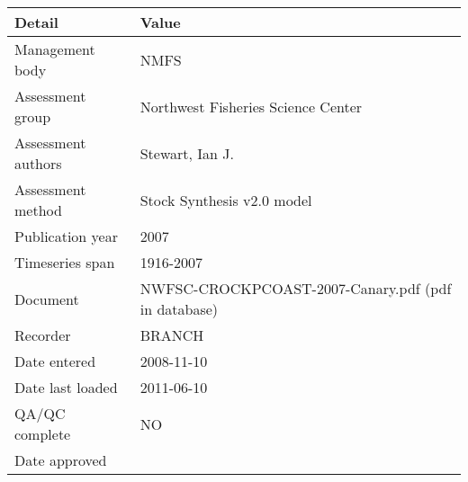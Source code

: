 \begin{table}[htb]
\centering
\begin{tabular}{lp{7cm}}
\toprule
Detail & Value \\
\midrule
Management body    & NMFS                                                \\
Assessment group   & Northwest Fisheries Science Center                  \\
Assessment authors & Stewart, Ian J.                                     \\
Assessment method  & Stock Synthesis v2.0 model                          \\
Publication year   & 2007                                                \\
Timeseries span    & 1916-2007                                           \\
Document           & NWFSC-CROCKPCOAST-2007-Canary.pdf (pdf in database) \\
Recorder           & BRANCH                                              \\
Date entered       & 2008-11-10                                          \\
Date last loaded   & 2011-06-10                                          \\
QA/QC complete     & NO                                                  \\
Date approved      &                                                     \\
\bottomrule
\end{tabular}
\label{tab:assessdet}
\end{table}
